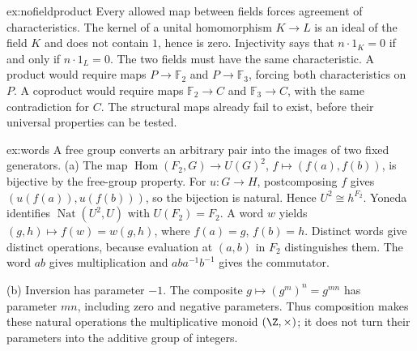 \begin{solution}{ex:nofieldproduct}
\idea Every allowed map between fields forces agreement of characteristics.
\writeup The kernel of a unital homomorphism $K\to L$ is an ideal of the field $K$ and does not contain $1$, hence is zero. Injectivity says that $n\cdot1_K=0$ if and only if $n\cdot1_L=0$. The two fields must have the same characteristic. A product would require maps $P\to\mathbb F_2$ and $P\to\mathbb F_3$, forcing both characteristics on $P$. A coproduct would require maps $\mathbb F_2\to C$ and $\mathbb F_3\to C$, with the same contradiction for $C$. The structural maps already fail to exist, before their universal properties can be tested.
\end{solution}

\begin{solution}{ex:words}
\idea A free group converts an arbitrary pair into the images of two fixed generators.
\writeup (a) The map $\operatorname{Hom}(F_2,G)\to U(G)^2$, $f\mapsto(f(a),f(b))$, is bijective by the free-group property. For $u:G\to H$, postcomposing $f$ gives $(u(f(a)),u(f(b)))$, so the bijection is natural. Hence $U^2\cong h^{F_2}$. Yoneda identifies $\operatorname{Nat}(U^2,U)$ with $U(F_2)=F_2$. A word $w$ yields $(g,h)\mapsto f(w)=w(g,h)$, where $f(a)=g$, $f(b)=h$. Distinct words give distinct operations, because evaluation at $(a,b)$ in $F_2$ distinguishes them. The word $ab$ gives multiplication and $aba^{-1}b^{-1}$ gives the commutator.

(b) Inversion has parameter $-1$. The composite $g\mapsto(g^m)^n=g^{mn}$ has parameter $mn$, including zero and negative parameters. Thus composition makes these natural operations the multiplicative monoid $(\Z,\times)$; it does not turn their parameters into the additive group of integers.
\end{solution}

